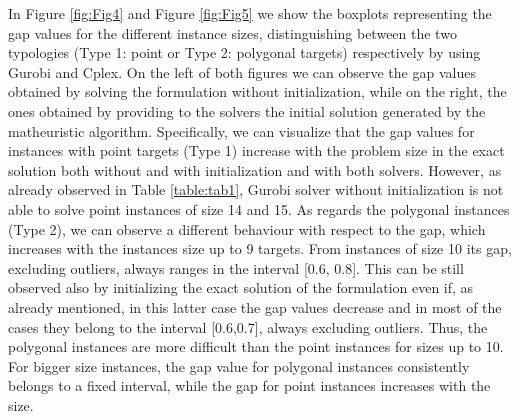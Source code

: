 In Figure \ref{fig:Fig4} and Figure \ref{fig:Fig5} we show the boxplots representing the gap values for the different instance sizes, distinguishing between the two typologies (Type 1: point or Type 2: polygonal targets) respectively by using Gurobi and Cplex. On the left of both figures we can observe the gap values obtained by solving the formulation without initialization, while on the right, the ones obtained by providing to the solvers the initial solution generated by the matheuristic algorithm. 
Specifically, we can visualize that the gap values for instances with point targets (Type 1) increase with the problem size in the exact solution both without and with initialization and with both solvers. However, as already observed in Table \ref{table:tab1}, Gurobi solver without initialization is not able to solve point instances of size 14 and 15. As regards the polygonal instances (Type 2), we can observe a different behaviour with respect to the gap, which increases with the instances size up to 9 targets. From instances of size 10 its gap, excluding outliers, always ranges in the interval [0.6, 0.8]. This can be still observed also by initializing the exact solution of the formulation even if, as already mentioned, in this latter case the gap values decrease and in most of the cases they belong to the interval [0.6,0.7], always excluding outliers. Thus, the polygonal instances are more difficult than the point instances for sizes up to 10. For bigger size instances, the gap value for polygonal instances consistently belongs to a fixed interval, while the gap for point instances increases with the size. 

